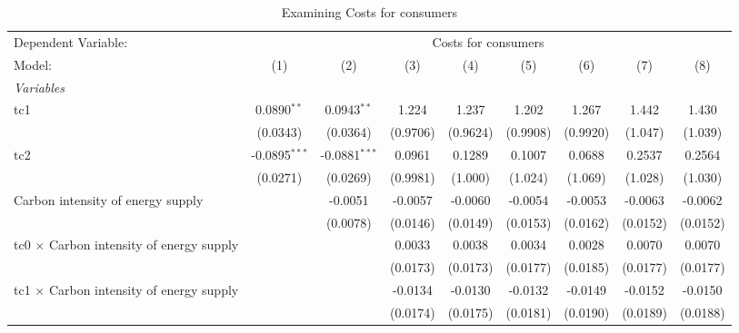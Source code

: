 
\begin{table}[htbp]
   \caption{Examining Costs for consumers}
   \centering
   \begin{tabular}{lcccccccc}
      \tabularnewline \midrule \midrule
      Dependent Variable: & \multicolumn{8}{c}{Costs for consumers}\\
      Model:                                          & (1)             & (2)             & (3)      & (4)      & (5)      & (6)      & (7)      & (8)\\  
      \midrule
      \emph{Variables}\\
      tc1                                             & 0.0890$^{**}$   & 0.0943$^{**}$   & 1.224    & 1.237    & 1.202    & 1.267    & 1.442    & 1.430\\   
                                                      & (0.0343)        & (0.0364)        & (0.9706) & (0.9624) & (0.9908) & (0.9920) & (1.047)  & (1.039)\\   
      tc2                                             & -0.0895$^{***}$ & -0.0881$^{***}$ & 0.0961   & 0.1289   & 0.1007   & 0.0688   & 0.2537   & 0.2564\\   
                                                      & (0.0271)        & (0.0269)        & (0.9981) & (1.000)  & (1.024)  & (1.069)  & (1.028)  & (1.030)\\   
      Carbon intensity of energy supply               &                 & -0.0051         & -0.0057  & -0.0060  & -0.0054  & -0.0053  & -0.0063  & -0.0062\\   
                                                      &                 & (0.0078)        & (0.0146) & (0.0149) & (0.0153) & (0.0162) & (0.0152) & (0.0152)\\   
      tc0 $\times$ Carbon intensity of energy supply  &                 &                 & 0.0033   & 0.0038   & 0.0034   & 0.0028   & 0.0070   & 0.0070\\   
                                                      &                 &                 & (0.0173) & (0.0173) & (0.0177) & (0.0185) & (0.0177) & (0.0177)\\   
      tc1 $\times$ Carbon intensity of energy supply  &                 &                 & -0.0134  & -0.0130  & -0.0132  & -0.0149  & -0.0152  & -0.0150\\   
                                                      &                 &                 & (0.0174) & (0.0175) & (0.0181) & (0.0190) & (0.0189) & (0.0188)\\   

\end{tabular}
\end{table}
